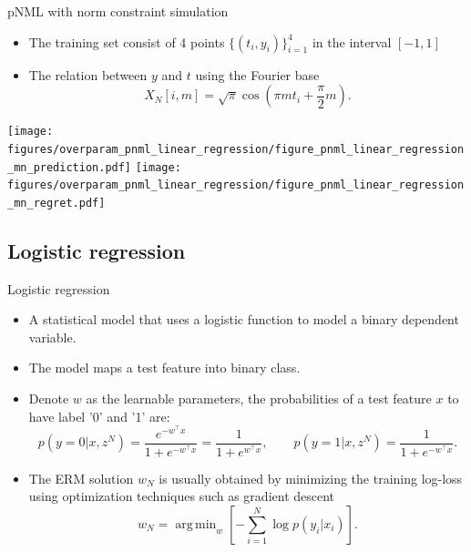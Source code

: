 \documentclass[aspectratio=169]{beamer}
\DeclareMathOperator*{\argmin}{arg\,min}
\begin{document}
\begin{frame}{pNML with norm constraint simulation}
\begin{itemize}
\item The training set consist of 4 points $\{(t_i,y_i)\}_{i=1}^4$ in the interval $[-1, 1]$
\item The relation between $y$ and $t$ using the Fourier base
    \begin{equation}
    X_{N}[i,m]
    =
    \sqrt{\pi} \cos \left(\pi m t_i +  \frac{\pi}{2} m\right) .
    \end{equation}
\end{itemize}

\centering
\texttt{[image: figures/overparam\_pnml\_linear\_regression/figure\_pnml\_linear\_regression\_mn\_prediction.pdf]}
\texttt{[image: figures/overparam\_pnml\_linear\_regression/figure\_pnml\_linear\_regression\_mn\_regret.pdf]}
\end{frame}

\subsection{Logistic regression}
\begin{frame}{Logistic regression}
\begin{itemize}
\item A statistical model that uses a logistic function to model a binary dependent variable.
\item The model maps a test feature into binary class.
\item Denote $w$ as the learnable parameters, the probabilities of a test feature $x$ to have label '0' and '1' are:
\begin{equation}
    p(y=0|x,z^N) = \frac{e^{-w^\top x}}{1 + e^{-w^\top x}} = \frac{1}{1 + e^{w^\top x}}, \qquad
    p(y=1|x, z^N) = \frac{1}{1 + e^{-w^\top x}}.
\end{equation}
\item The ERM solution $w_N$ is usually obtained by minimizing the training log-loss using optimization techniques such as gradient descent
\begin{equation}
w_N = \argmin_{w} \left[ - \sum_{i=1}^N \log p(y_i|x_i) \right].
\end{equation}
\end{itemize}
\end{frame}
\end{document}
